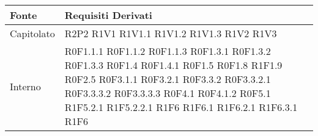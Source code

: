 	\begin{center}

	\def\arraystretch{1.5}
	\bgroup
	\begin{longtable}{| p{4cm} | p{4cm} |}

		\hline
		\textbf{Fonte} & \textbf{Requisiti Derivati} \\
		\hline

		Capitolato  &  R2P2 \newline R1V1 \newline R1V1.1 \newline R1V1.2 \newline R1V1.3 \newline R1V2 \newline R1V3 \\
		\hline
		Interno  &  R0F1.1.1 \newline R0F1.1.2 \newline R0F1.1.3 \newline R0F1.3.1 \newline R0F1.3.2 \newline R0F1.3.3 \newline R0F1.4 \newline R0F1.4.1 \newline R0F1.5 \newline R0F1.8 \newline R1F1.9 \newline R0F2.5 \newline R0F3.1.1 \newline R0F3.2.1 \newline R0F3.3.2 \newline R0F3.3.2.1 \newline R0F3.3.3.2 \newline R0F3.3.3.3 \newline R0F4.1 \newline R0F4.1.2 \newline R0F5.1 \newline R1F5.2.1 \newline R1F5.2.2.1 \newline R1F6 \newline R1F6.1 \newline R1F6.2.1 \newline R1F6.3.1 \newline R1F6
\end{longtable}
\end{center}
